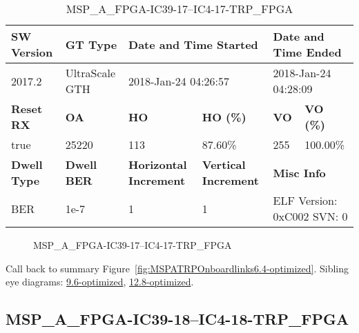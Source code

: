 \begin{table}[h]
\centering
\caption{MSP\_A\_FPGA-IC39-17--IC4-17-TRP\_FPGA}
\label{tab:MSPAFPGAIC3917IC417TRPFPGA6.4-optimized}
\begin{tabular}{@{}|l|l|l|l|l|l|@{}}
\toprule
\textbf{SW Version}                & \textbf{GT Type}   & \multicolumn{2}{l|}{\textbf{Date and Time Started}}            & \multicolumn{2}{l|}{\textbf{Date and Time Ended}}        \\ \midrule
2017.2                       & UltraScale GTH          & \multicolumn{2}{l|}{2018-Jan-24 04:26:57}                   & \multicolumn{2}{l|}{2018-Jan-24 04:28:09}               \\ \midrule
\textbf{Reset RX}                  & \textbf{OA} & \textbf{HO}   & \textbf{HO (\%)} & \textbf{VO} & \textbf{VO (\%)} \\ \midrule
true & 25220        & 113          & 87.60\%        & 255        & 100.00\%       \\ \midrule
\textbf{Dwell Type}                & \textbf{Dwell BER} & \textbf{Horizontal Increment} & \textbf{Vertical Increment}    & \multicolumn{2}{l|}{\textbf{Misc Info}}                  \\ \midrule
BER                            & 1e-7        & 1        & 1           & \multicolumn{2}{l|}{ELF Version: 0xC002 SVN: 0}                         \\ \bottomrule
\end{tabular}
\end{table}

\begin{figure}[h]
\caption{MSP\_A\_FPGA-IC39-17--IC4-17-TRP\_FPGA} \label{fig:MSPAFPGAIC3917IC417TRPFPGA6.4-optimized}
\end{figure}

Call back to summary Figure~\ref{fig:MSPATRPOnboardlinks6.4-optimized}.
Sibling eye diagrams: \hyperref[sec:MSPAFPGAIC3917IC417TRPFPGA9.6-optimized]{9.6-optimized}, \hyperref[sec:MSPAFPGAIC3917IC417TRPFPGA12.8-optimized]{12.8-optimized}.

\clearpage
\newpage


\subsection{MSP\_A\_FPGA-IC39-18--IC4-18-TRP\_FPGA}\label{sec:MSPAFPGAIC3918IC418TRPFPGA6.4-optimized}

